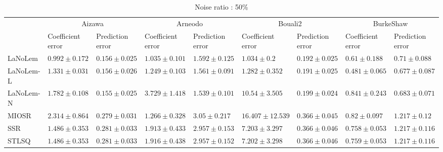 \begin{table*}
\centering
\caption{Noise ratio : 50\%}
\label{}
\scalebox{0.7}
{
\begin{tabular}{lllllllll}
\toprule
 & \multicolumn{2}{c}{Aizawa} & \multicolumn{2}{c}{Arneodo} & \multicolumn{2}{c}{Bouali2} & \multicolumn{2}{c}{BurkeShaw} \\
 & Coefficient error & Prediction error & Coefficient error & Prediction error & Coefficient error & Prediction error & Coefficient error & Prediction error \\
\midrule
LaNoLem & $\mathbf{0.992}\pm 0.172$ & $0.156\pm 0.025$ & $\mathbf{1.035}\pm 0.101$ & $1.592\pm 0.125$ & $\mathbf{1.034}\pm 0.2$ & $0.192\pm 0.025$ & $0.61\pm 0.188$ & $0.71\pm 0.088$ \\
LaNoLem-L & $1.331\pm 0.031$ & $0.156\pm 0.026$ & $1.249\pm 0.103$ & $1.561\pm 0.091$ & $1.282\pm 0.352$ & $\mathbf{0.191}\pm 0.025$ & $\mathbf{0.481}\pm 0.065$ & $\mathbf{0.677}\pm 0.087$ \\
LaNoLem-N & $1.782\pm 0.108$ & $\mathbf{0.155}\pm 0.025$ & $3.729\pm 1.418$ & $\mathbf{1.539}\pm 0.101$ & $10.54\pm 3.505$ & $0.199\pm 0.024$ & $0.841\pm 0.243$ & $0.683\pm 0.071$ \\
MIOSR & $2.314\pm 0.864$ & $0.279\pm 0.031$ & $1.266\pm 0.328$ & $3.05\pm 0.217$ & $16.407\pm 12.539$ & $0.366\pm 0.045$ & $0.82\pm 0.097$ & $1.217\pm 0.12$ \\
SSR & $1.486\pm 0.353$ & $0.281\pm 0.033$ & $1.913\pm 0.433$ & $2.957\pm 0.153$ & $7.203\pm 3.297$ & $0.366\pm 0.046$ & $0.758\pm 0.053$ & $1.217\pm 0.116$ \\
STLSQ & $1.486\pm 0.353$ & $0.281\pm 0.033$ & $1.916\pm 0.438$ & $2.957\pm 0.152$ & $7.202\pm 3.298$ & $0.366\pm 0.046$ & $0.759\pm 0.053$ & $1.217\pm 0.116$ \\

\midrule


\end{tabular}}
\end{table*}
